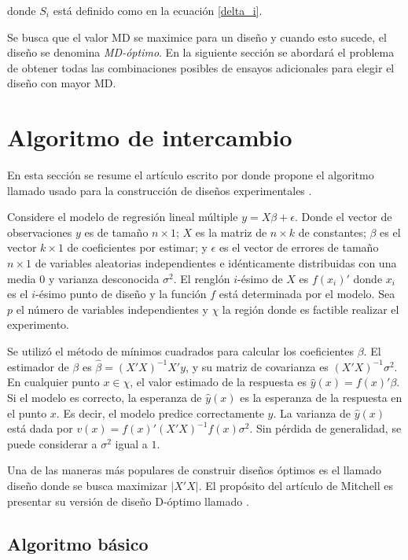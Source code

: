 \noindent donde $S_i$ está definido como en la ecuación \ref{delta_i}. 

Se busca que el valor MD se maximice para un diseño y cuando esto sucede, el diseño se denomina \textit{MD-óptimo}. En la siguiente sección se abordará el problema de obtener todas las combinaciones posibles de ensayos adicionales para elegir el diseño con mayor MD. 


\section{Algoritmo de intercambio} \label{sec_algInterca}
En esta sección se resume el artículo escrito por \cite{mitchelldetmax} donde propone el algoritmo llamado  usado para la construcción de diseños experimentales . 

Considere el modelo de regresión lineal múltiple $y = X \beta + \epsilon$. Donde el vector de observaciones $y$ es de tamaño $n \times 1$; $X$ es la matriz de $n \times k$ de constantes; $\beta$ es el vector $k \times 1$ de coeficientes por estimar; y $\epsilon$ es el vector de errores de tamaño $n \times 1$ de variables aleatorias independientes e idénticamente distribuidas con una media $0$ y varianza desconocida $\sigma^{2}$. El renglón $i$-ésimo de $X$ es $f(x_i)'$ donde $x_i$ es el $i$-ésimo punto de diseño y la función $f$ está determinada por el modelo. Sea $p$ el número de variables independientes y $\chi$ la región donde es factible realizar el experimento.

Se utilizó el método de mínimos cuadrados para calcular los coeficientes $\beta$. El estimador de $\beta$ es $\hat{\beta} = (X'X)^{-1} X'y$, y su matriz de covarianza es $(X'X)^{-1} \sigma^{2}$. En cualquier punto $x \in \chi$, el valor estimado de la  respuesta es $\hat{y} (x) = f(x)' \beta$. Si el modelo es correcto, la esperanza de $\hat{y}(x)$ es la esperanza de la respuesta en el punto $x$. Es decir, el modelo predice correctamente $y$. La varianza de $\hat{y}(x)$ está dada por $v(x) = f(x)' (X'X)^{-1} f(x) \sigma^{2}$. Sin pérdida de generalidad, se puede considerar a $\sigma^{2}$ igual a $1$. 

Una de las maneras más populares de construir diseños óptimos es el llamado diseño  donde se busca maximizar $|X'X|$. El propósito del artículo de Mitchell es presentar su versión de diseño D-óptimo llamado . 

\subsection{Algoritmo básico}

